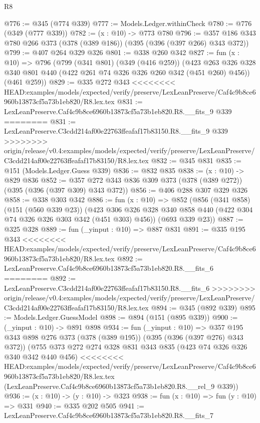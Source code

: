 \begin{lexlean}{R8}
\begin{coremodule}
{{{{{{{{{{{{{{{{{{{{{{{@776 := @345 (@774 @339)
@777 := Models.Ledger.withinCheck
@780 := @776 (@349 (@777 @339))
@782 := (x : @10) -> @773 @780
@796 := @357 @186 @343 @780 @266 @373 (@378 (@389 @186)) (@395 (@396 (@397 @266) @343 @372))
@799 := @407 @264 @329 @326
@801 := @338 @260 @342
@827 := fun (x : @10) =>
  @796
    (@799
      (@341 @801)
      (@349 (@416 @259))
      (@423 @263 @326 @328 @340 @801 @440 (@422 @261 @74 @326 @326 @260 @342 (@451 @260) @456))
      (@461 @259))
@829 := @335 @272 @343
<<<<<<<< HEAD:examples/models/expected/verify/preserve/LexLeanPreserve/Caf4c9b8ce6960b13873cf5a73b1eb820/R8.lex.tex
@831 := LexLeanPreserve.Caf4c9b8ce6960b13873cf5a73b1eb820.R8.__fits_9 @339
========
@831 := LexLeanPreserve.C3cdd214af00e22763ffeafaf17b83150.R8.__fits_9 @339
>>>>>>>> origin/release/v0.4:examples/models/expected/verify/preserve/LexLeanPreserve/C3cdd214af00e22763ffeafaf17b83150/R8.lex.tex
@832 := @345 @831
@835 := @151 (Models.Ledger.Guess @339)
@836 := @832 @835
@838 := (x : @10) -> @829 @836
@852 := @357 @272 @343 @836 @309 @373 (@378 (@389 @272)) (@395 (@396 (@397 @309) @343 @372))
@856 := @406 @288 @307 @329 @326
@858 := @338 @303 @342
@886 := fun (x : @10) =>
  @852
    (@856
      (@341 @858)
      (@151 (@560 @339 @23))
      (@423 @306 @326 @328 @340 @858 @440 (@422 @304 @74 @326 @326 @303 @342 (@451 @303) @456))
      (@693 @339 @23))
@887 := @325 @328
@889 := fun (_yinput : @10) => @887 @831
@891 := @335 @195 @343
<<<<<<<< HEAD:examples/models/expected/verify/preserve/LexLeanPreserve/Caf4c9b8ce6960b13873cf5a73b1eb820/R8.lex.tex
@892 := LexLeanPreserve.Caf4c9b8ce6960b13873cf5a73b1eb820.R8.__fits_6
========
@892 := LexLeanPreserve.C3cdd214af00e22763ffeafaf17b83150.R8.__fits_6
>>>>>>>> origin/release/v0.4:examples/models/expected/verify/preserve/LexLeanPreserve/C3cdd214af00e22763ffeafaf17b83150/R8.lex.tex
@894 := @345 (@892 @339)
@895 := Models.Ledger.GuessModel
@898 := @894 (@151 (@895 @339))
@900 := (_yinput : @10) -> @891 @898
@934 := fun (_yinput : @10) =>
  @357
    @195
    @343
    @898
    @276
    @373
    (@378 (@389 @195))
    (@395 (@396 (@397 @276) @343 @372))
    (@755
      @373
      @272
      @274
      @328
      @831
      @343
      @835
      (@423 @74 @326 @326 @340 @342 @440 @456)
<<<<<<<< HEAD:examples/models/expected/verify/preserve/LexLeanPreserve/Caf4c9b8ce6960b13873cf5a73b1eb820/R8.lex.tex
      (LexLeanPreserve.Caf4c9b8ce6960b13873cf5a73b1eb820.R8.__rel_9 @339))
@936 := (x : @10) -> (y : @10) -> @323
@938 := fun (x : @10) => fun (y : @10) => @331
@940 := @335 @202 @505
@941 := LexLeanPreserve.Caf4c9b8ce6960b13873cf5a73b1eb820.R8.__fits_7
}}}}}}}}}}}}}}}}}}}}}}}
\end{coremodule}
\end{lexlean}
